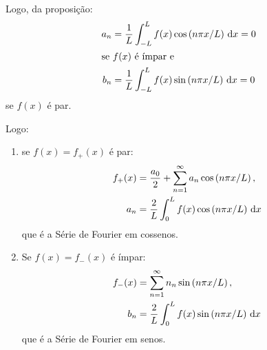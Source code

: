 Logo, da proposi\c{c}\~{a}o:
\begin{align*}
    a_n &= \frac{1}{L} \int_{-L}^L f(x) \cos\left( n \pi x / L \right) \, \mathrm{d}x = 0 \\
    \intertext{se $f(x)$ \'{e} \'{i}mpar e}
    b_n &= \frac{1}{L} \int_{-L}^L f(x) \sin\left( n \pi x / L \right) \, \mathrm{d}x = 0
\end{align*}
se $f(x)$ \'{e} par.

Logo:
\begin{enumerate}
    \item se $f(x) = f_+(x)$ \'{e} par:
        \begin{align*}
            f_+(x) &= \frac{a_0}{2} + \sum_{n = 1}^\infty a_n \cos\left( n \pi x / L \right), \\
            a_n &= \frac{2}{L} \int_0^L f(x) \cos\left( n \pi x / L \right) \, \mathrm{d}x
        \end{align*}
        que \'{e} a S\'{e}rie de Fourier em cossenos.
    \item Se $f(x) = f_-(x)$ \'{e} \'{i}mpar:
        \begin{align*}
            f_-(x) &= \sum_{n = 1}^\infty n_n \sin\left( n \pi x / L \right), \\
            b_n &= \frac{2}{L} \int_0^L f(x) \sin\left( n \pi x / L \right) \, \mathrm{d}x
        \end{align*}
        que \'{e} a S\'{e}rie de Fourier em senos.
\end{enumerate}

